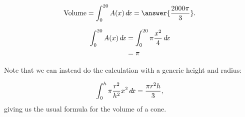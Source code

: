\documentclass{ximera}
\begin{document}
\begin{example}
\begin{question}
\[
\textrm{Volume} = 
  \int_0^{20} A(x) \d x=\answer{\frac{2000\pi}{3}}.
\]

\begin{hint}
	\begin{align*}
		\int_0^{20} A(x) \mathop{}\!d\! x &= \int_0^{20} \pi \frac{x^2}{4} \mathop{}\!d\! x\\ 
			&= \pi
	\end{align*}
\end{hint}
\end{question}

Note that we can instead do the calculation with a generic height and
radius: 

\[
  \int_0^{h} \pi\frac{r^2}{h^2}x^2\mathop{}\!d\! x
  = \frac{\pi r^2 h}{3},
\]
giving us the usual formula for the volume of a cone.
\end{example}
\end{document}
